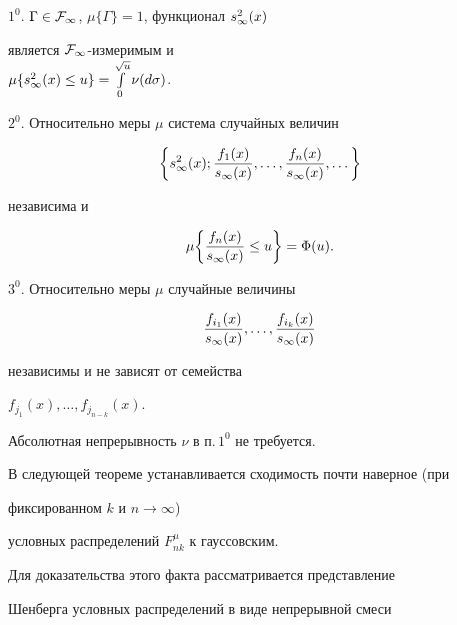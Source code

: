 \begin{thm}


$1^0$. $\Gamma\in{\cal F}_\infty$, $\mu\{\Gamma\}=1$, функционал $s^2_\infty(x)$


является ${\cal F}_\infty$-измеримым и \\


$\mu\{s^2_\infty(x)\le u\}=\int\limits_0^{\sqrt{u}}\nu(d\sigma)$.





$2^0$. Относительно меры $\mu$ система случайных величин


$$


\bigg\{\stwo;\frac{f_1(x)}{\s},\dotsc,\frac{f_n(x)}{\s},\dotsc\bigg\}


$$


независима и


$$


\mu\bigg\{\frac{f_n(x)}{\s}\le u\bigg\}=\Phi(u).


$$





$3^0$. Относительно меры $\mu$ случайные величины


$$


\frac{f_{i_1}(x)}{\s},\dotsc,\frac{f_{i_k}(x)}{\s}


$$


независимы и не зависят от семейства


$f_{j_1}(x),\dotsc,f_{j_{n-k}}(x)$.


\end{thm}








\begin{notenonum}


Абсолютная непрерывность $\nu$ в п.\,$1^0$ не требуется.


\end{notenonum}





В следующей теореме устанавливается сходимость почти наверное (при 


фиксированном $k$ и $n\to\infty$)


условных распределений $F^\mu_{nk}$ к гауссовским.


Для доказательства этого факта рассматривается представление


Шенберга условных распределений в виде непрерывной смеси


